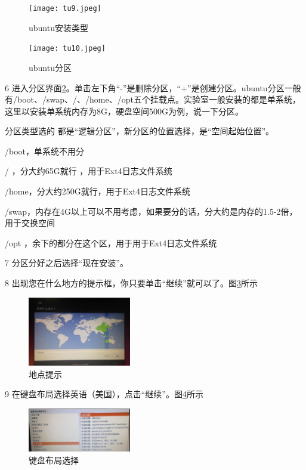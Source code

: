 \documentclass{article}
\begin{document}
\begin{figure}[!htb] %
\centering
\texttt{[image: tu9.jpeg]}
\caption{\small ubuntu安装类型}
\label{tu9}
\end{figure} 
\begin{figure}[!htb] %
\centering
\texttt{[image: tu10.jpeg]}
\caption{\small ubuntu分区}
\label{tu10}
\end{figure} 

  6 进入分区界面\ref{tu10}。单击左下角“-”是删除分区，“+”是创建分区。ubuntu分区一般有/boot、/swap、/、/home、/opt五个挂载点。实验室一般安装的都是单系统，这里以安装单系统内存为8G，硬盘空间500G为例，说一下分区。

分区类型选的 都是“逻辑分区”，新分区的位置选择，是“空间起始位置”。

/boot，单系统不用分

/    ，分大约65G就行 ，用于Ext4日志文件系统

/home，分大约250G就行，用于Ext4日志文件系统

/swap，内存在4G以上可以不用考虑，如果要分的话，分大约是内存的1.5-2倍，用于交换空间

/opt ，余下的都分在这个区，用于用于Ext4日志文件系统

  7 分区分好之后选择“现在安装”。

  8 出现您在什么地方的提示框，你只要单击“继续”就可以了。图\ref{tu12}所示

\begin{figure}[!htb] %
\centering
\includegraphics[width=0.4\textwidth]{tu12.jpeg}
\caption{\small 地点提示}
\label{tu12}
\end{figure} 

  9 在键盘布局选择英语（美国），点击“继续”。图\ref{tu13}所示
\begin{figure}[!htb] %
\centering
\includegraphics[width=0.4\textwidth]{tu13.jpeg}
\caption{\small 键盘布局选择}
\label{tu13}
\end{figure} 
\end{document}
